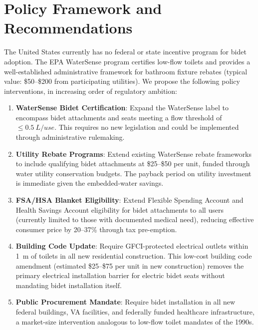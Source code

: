 \documentclass[10pt,letterpaper]{article}
\begin{document}
\section{Policy Framework and Recommendations}
\label{sec:policy}

The United States currently has no federal or state incentive program for
bidet adoption. The EPA WaterSense program certifies low-flow toilets and
provides a well-established administrative framework for bathroom fixture
rebates (typical value: \$50--\$200 from participating utilities). We propose
the following policy interventions, in increasing order of regulatory ambition:

\begin{enumerate}[leftmargin=*, label=\textbf{P\arabic*.}]
    \item \textbf{WaterSense Bidet Certification}: Expand the WaterSense
    label to encompass bidet attachments and seats meeting a flow threshold
    of $\leq0.5~L/ use$. This requires no new legislation and
    could be implemented through administrative rulemaking.
    \item \textbf{Utility Rebate Programs}: Extend existing WaterSense
    rebate frameworks to include qualifying bidet attachments at \$25--\$50
    per unit, funded through water utility conservation budgets. The payback
    period on utility investment is immediate given the embedded-water savings.
    \item \textbf{FSA/HSA Blanket Eligibility}: Extend Flexible Spending
    Account and Health Savings Account eligibility for bidet attachments
    to all users (currently limited to those with documented medical need),
    reducing effective consumer price by 20--37\% through tax pre-emption.
    \item \textbf{Building Code Update}: Require GFCI-protected electrical
    outlets within 1~m of toilets in all new residential construction.
    This low-cost building code amendment (estimated \$25--\$75 per unit in
    new construction) removes the primary electrical installation barrier
    for electric bidet seats without mandating bidet installation itself.
    \item \textbf{Public Procurement Mandate}: Require bidet installation
    in all new federal buildings, VA facilities, and federally funded
    healthcare infrastructure, a market-size intervention analogous to
    low-flow toilet mandates of the 1990s.
\end{enumerate}
\end{document}
